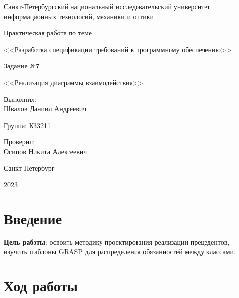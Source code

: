 \documentclass[a4paper, 14pt]{extarticle}
\begin{document}
\begin{titlepage}
  \vspace{0pt plus2fill}
  \noindent

  \vspace{0pt plus6fill}
  \begin{center}
    Санкт-Петербургский национальный исследовательский университет
    информационных технологий, механики и оптики

    \vspace{0pt plus2fill}

    Практическая работа по теме:

    <<Разработка спецификации требований к программному обеспечению>>

    \vspace{0pt plus1fill}

    Задание №7

    <<Реализация диаграммы взаимодействия>>

  \end{center}

  \vspace{0pt plus7fill}
  \begin{flushright}
    Выполнил: \\
    Швалов Даниил Андреевич

    Группа: К33211

    Проверил: \\
    Осипов Никита Алексеевич
  \end{flushright}

  \vspace{0pt plus2fill}
  \begin{center}
    Санкт-Петербург

    2023
  \end{center}
\end{titlepage}

\setcounter{page}{2}

\section{Введение}

\textbf{Цель работы}: освоить методику проектирования реализации прецедентов,
изучить шаблоны GRASP для распределения обязанностей между классами.

\section{Ход работы}
\end{document}
